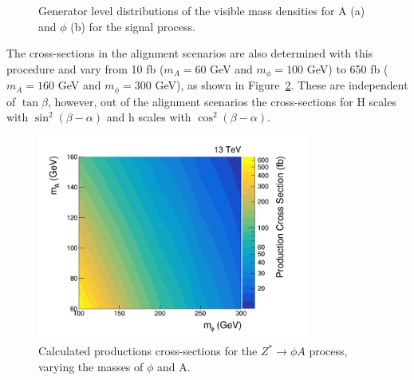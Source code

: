 \begin{figure}[!hbtp]
\centering
\caption[Plots of the signal $m_{\tau\tau}$ generator level distributions of $\phi$ and A.]{Generator level distributions of the visible mass densities for A (a) and $\phi$ (b) for the signal process.}
\label{fig:4tau_gen_dist}
\end{figure}

The cross-sections in the alignment scenarios are also determined with this procedure and vary from 10 fb ($m_{A}=60$ GeV and $m_{\phi}=100$ GeV) to 650 fb ($m_{A}=160$ GeV and $m_{\phi}=300$ GeV), as shown in Figure~\ref{fig:4tau_xs}.
These are independent of $\tan\beta$, however, out of the alignment scenarios the cross-sections for H scales with $\sin^{2}(\beta-\alpha)$ and h scales with $\cos^{2}(\beta-\alpha)$. \\

\begin{figure}[!hbtp]
\centering
    \includegraphics[width=0.8\textwidth]{Figures/cross_sections.png}
\caption[Plot of the production cross-sections for the $Z^{*} \rightarrow \phi A$ process.]{Calculated productions cross-sections for the $Z^{*} \rightarrow \phi A$ process, varying the masses of $\phi$ and A.}
\label{fig:4tau_xs}
\end{figure}

